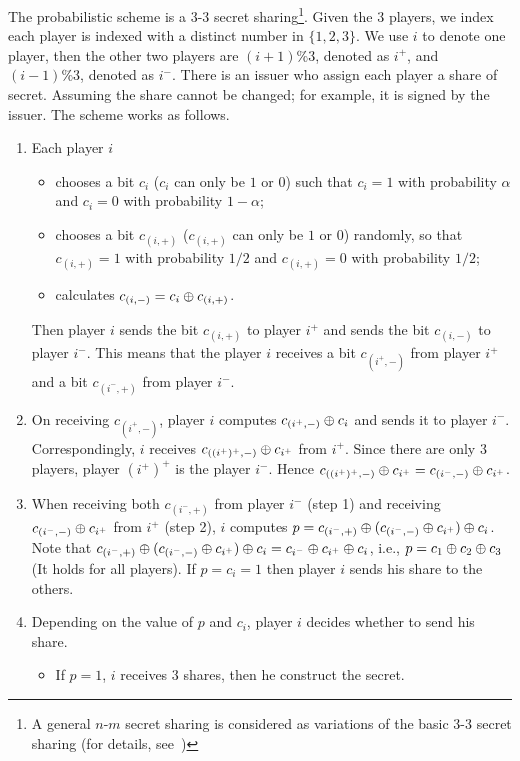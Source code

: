 The probabilistic scheme is a $3\mbox{-}3$ secret sharing\footnote{A general $n\mbox{-}m$ secret sharing is considered as variations of the basic $3\mbox{-}3$ secret sharing (for details, see~\cite{HT04})}. 
Given the $3$ players, we index each player is indexed with a distinct number in $\{1, 2, 3\}$. We use $i$ to denote one player, then the other two players are $(i+1)\%3$, denoted as $i^+$, and $(i-1)\%3$, denoted as $i^-$. There is an issuer who assign each player a share of secret. Assuming the share cannot be changed; for example, it is signed by the issuer.
The scheme works as follows.
\begin{enumerate}
\item Each player $i$
\begin{itemize}
\item chooses a bit $c_i$ ($c_i$ can only be $1$ or $0$) such that $c_i =1$ with probability $\alpha$ and $c_i = 0$ with probability $1-\alpha$; 
\item chooses a bit $c_{(i,+)}$ ($c_{(i,+)}$ can only be $1$ or $0$) randomly, so that $c_{(i,+)}=1$ with probability $1/2$ and $c_{(i,+)}=0$ with probability $1/2$;
\item calculates $c_{(i,-)}= c_i \mathbin{\oplus} c_{(i,+)}$. 
\end{itemize}
Then player $i$ sends the bit $c_{(i,+)}$ to player $i^+$ and sends the bit $c_{(i,-)}$ to player $i^-$. This means that the player $i$ receives a bit $c_{(i^+,-)}$ from player $i^+$ and a bit $c_{(i^-,+)}$ from player $i^-$.
\item On receiving $c_{(i^+,-)}$, player $i$ computes $c_{(i^+,-)} \mathbin{\oplus} c_i$ and sends it to player $i^-$. Correspondingly, $i$ receives $c_{((i^+)^+, -)} \mathbin{\oplus} c_{i^+}$ from $i^+$. Since there are only $3$ players, player $(i^+)^+$ is the player $i^-$. Hence $c_{((i^+)^+, -)} \mathbin{\oplus} c_{i^+}=c_{(i^-,-)} \mathbin{\oplus} c_{i^+}$.
\item When receiving both $c_{(i^-,+)}$ from player $i^-$ (step 1) and receiving $c_{(i^-,-)} \mathbin{\oplus} c_{i^+}$ from $i^+$ (step 2), $i$ computes $p = c_{(i^-,+)} \mathbin{\oplus} (c_{(i^-,-)}\mathbin{\oplus} c_{i^+})\mathbin{\oplus} c_i$. Note that $ c_{(i^-,+)} \mathbin{\oplus} (c_{(i^-,-)}\mathbin{\oplus} c_{i^+})\mathbin{\oplus} c_i=c_{i^-} \mathbin{\oplus} c_{i^+}\mathbin{\oplus} c_i$, i.e., $p=c_1 \mathbin{\oplus} c_2 \mathbin{\oplus} c_3$ (It holds for all players).
If $p = c_i = 1$ then player $i$ sends his share to the others.
\item Depending on the value of $p$ and $c_i$, player $i$ decides whether to send his share.
\begin{itemize}
\item If $p=1$, $i$ receives $3$ shares, then he construct the secret.

\end{itemize}
\end{enumerate}

